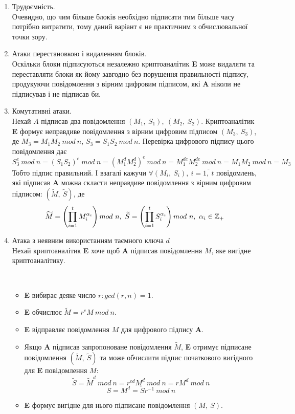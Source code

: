 \begin{enumerate}
\item Трудоємність.\\
Очевидно, що чим більше блоків необхідно підписати тим більше часу потрібно витратити, тому даний варіант є не практичним з обчислювальної точки зору.
\item Атаки перестановкою і видаленням блоків. \\
Оскільки блоки підписуються незалежно криптоаналітик \textbf{E} може видаляти та переставляти блоки як йому завгодно без порушення правильності підпису, продукуючи повідомлення з вірним цифровим підписом, які \textbf{A} ніколи не підписував і не підписав би. 
\item Комутативні атаки. \\
Нехай \( A \) підписав два повідомлення \( \left( M_1,\ S_1 \right),\ \left( M_2,\ S_2 \right) \). Криптоаналітик \textbf{E} формує неправдиве повідомлення з вірним цифровим підписом \( \left(M_3,\ S_3 \right) \), де \( M_3 = M_1 M_2 \ mod\ n \), \( S_3 = S_1 S_2 \ mod\ n \). Перевірка цифрового підпису цього повідомлення дає \[ S_3^e \ mod\ n = (S_1 S_2)^e\ mod\ n = (M_1^d M_2^d)^e \ mod\ n = M_1^{de} M_2^{de} \ mod\ n = M_1 M_2\ mod\ n = M_3 \]
Тобто підпис правильний. І взагалі кажучи \( \forall (M_i,\ S_i),\ i = \overline{1,\ t} \) повідомлень, які підписав \textbf{A} можна скласти неправдиве повідомлення з вірним цифровим підписом: \( ( \widetilde{M},\ \widetilde{S} ) \), де \[ \widetilde{M} = \left( \prod_{i=1}^t M_i^{\alpha_i} \right) mod\ n,\ \widetilde{S} = \left( \prod_{i=1}^t S_i^{\alpha_i} \right) mod\ n, \ \alpha_i \in \mathbb Z_{+} \]
\item Атака з неявним використанням таємного ключа \( d \)\\
Нехай криптоаналітик \textbf{E} хоче щоб \textbf{A} підписав повідомлення \( M \), яке вигідне криптоаналітику. 
\begin{algorithm}\ 
\begin{itemize}
\item \textbf{E} вибирає деяке число \( r \colon gcd(r,n) = 1 \).
\item \textbf{E} обчислює \( \widetilde{M} = r^e M\ mod\ n \).
\item \textbf{E} відправляє повідомлення \( M \) для цифрового підпису \textbf{A}.
\item Якщо \textbf{A} підписав запропоноване повідомлення \( \widetilde{M} \), \textbf{E} отримує підписане повідомлення \( (\widetilde{M},\ \widetilde{S}) \) та може обчислити підпис початкового вигідного для \textbf{E} повідомлення \( M \):
\[ \widetilde{S} = \widetilde{M}^d\ mod\ n = r^{ed} M^d\ mod\ n = r M^d\ mod\ n\]
\[ S = M^d = \widetilde{S} r^{-1}\ mod\ n \]
\item \textbf{E} формує вигідне для нього підписане повідомлення \( \left( M,\ S \right) \). 
\end{itemize}
\end{algorithm}
\end{enumerate}

